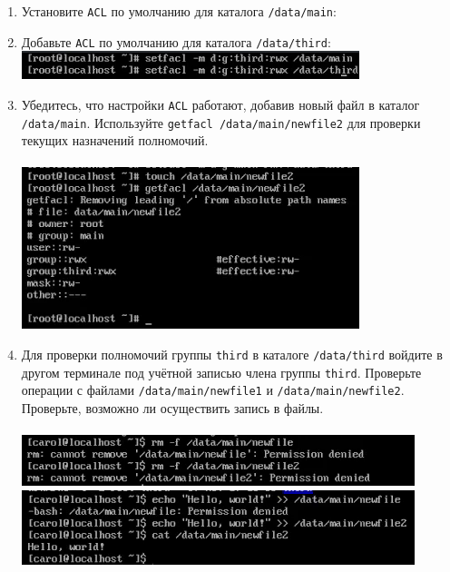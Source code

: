 \documentclass[12pt]{article}
\begin{document}
\begin{enumerate}
	\item Установите \texttt{ACL} по умолчанию для каталога \texttt{/data/main}:
	\item Добавьте \texttt{ACL} по умолчанию для каталога \texttt{/data/third}:
	      \\\includegraphics{11.png}
	\item Убедитесь, что настройки \texttt{ACL} работают, добавив новый файл в каталог \texttt{/data/main}. Используйте \texttt{getfacl /data/main/newfile2} для проверки текущих назначений полномочий.\\
	      \\\includegraphics{12.png}
	\item Для проверки полномочий группы \texttt{third} в каталоге \texttt{/data/third} войдите в другом терминале под учётной записью члена группы \texttt{third}. Проверьте операции с файлами \texttt{/data/main/newfile1} и \texttt{/data/main/newfile2}. Проверьте, возможно ли осуществить запись в файлы.\\
	      \\\includegraphics{13.png}
	      \\\includegraphics{14.png}
\end{enumerate}
\end{document}
